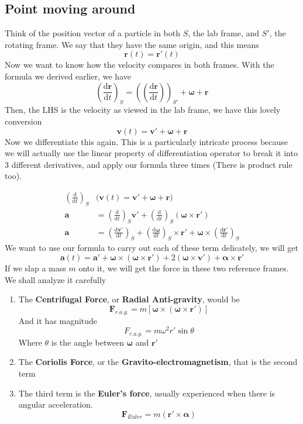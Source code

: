 \documentclass[12pt]{article}
\newcommand{\dydx}[2]{\frac{\text{d} #1}{\text{d} #2}}
\newcommand{\sqbkt}[1]{\left[ #1 \right]}
\newcommand{\paren}[1]{\left( #1 \right)}
\begin{document}
\subsection{Point moving around}
Think of the position vector of a particle in both $S$, the lab frame, and $S'$, the rotating frame. We say that they have the same origin, and this means
\[
\mathbf{r}(t) = \mathbf{r}'(t)
\]
Now we want to know how the velocity compares in both frames. With the formula we derived earlier, we have
\[
\paren{\dydx{\mathbf{r}}{t}}_S = \paren{\paren{\dydx{\mathbf{r}}{t}}}_{S'} +\boldsymbol{\omega}+\mathbf{r}
\]
Then, the LHS is the velocity as viewed in the lab frame, we have this lovely conversion
\[
\mathbf{v}(t) = \mathbf{v}' + \boldsymbol{\omega }+ \mathbf{r}
\]
Now we differentiate this again. This is a particularly intricate process because we will actually use the linear property of differentiation operator to break it into 3 different derivatives, and apply our formula three times (There is product rule too).

\begin{align}
\paren{\dydx{}{t}}_S&\biggl( \mathbf{v}(t) = \mathbf{v}' + \boldsymbol{\omega }+ \mathbf{r} \biggr)\\
\mathbf{a} & = \paren{\dydx{}{t}}_S\mathbf{v}' + \paren{\dydx{}{t}}_S\paren{\boldsymbol\omega \times \mathbf{r}'}\\
\mathbf{a} &= \paren{\dydx{\mathbf{v}'}{t}}_S + \paren{\dydx{\boldsymbol{\omega}}{t}}_S \times \mathbf{r}' + \boldsymbol{\omega}\times\paren{\dydx{\mathbf{r}'}{t}}_S
\end{align}
We want to use our formula to carry out each of these term delicately, we will get
\[
\mathbf{a}(t) = \mathbf{a}' + \boldsymbol{\omega}\times\paren{\boldsymbol{\omega}\times \mathbf{r}'} + 2\paren{\boldsymbol{\omega}\times \mathbf{v}'} + \boldsymbol{\alpha} \times \mathbf{r}'
\]
If we slap a mass $m$ onto it, we will get the force in these two reference frames. We shall analyze it carefully

\begin{enumerate}
    \item The \textbf{Centrifugal Force}, or \textbf{Radial Anti-gravity}, would be
    \[
    \mathbf{F}_{r.a.g.} = m\sqbkt{\boldsymbol{\omega}\times\paren{\boldsymbol{\omega}\times \mathbf{r}'}}
    \]
    And it has magnitude
    \[
    F_{r.a.g.} =m \omega^2r'\sin\theta
    \]
    Where $\theta$ is the angle between $\boldsymbol\omega$ and $\mathbf{r}'$

    \item The \textbf{Coriolis Force}, or the \textbf{Gravito-electromagnetism}, that is the second term 

    \item The third term is the \textbf{Euler's force}, usually experienced when there is angular acceleration.
    \[
    \mathbf{F}_{Euler} = m\paren{\mathbf{r}' \times \boldsymbol{\alpha}}
    \]
\end{enumerate}
\end{document}
